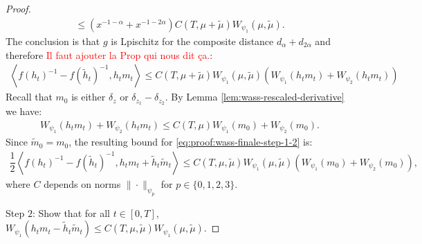 \documentclass[11pt,a4paper]{article}
\newcommand{\red}[1]{\textcolor{red}{#1}}
\newcommand{\brac}[1]{\left\langle#1\right\rangle}
\begin{document}
\begin{proof}
\begin{multline*}
        \leq \left(x^{-1-\alpha} + x^{-1-2\alpha}\right)C(T,\mu + \tilde{\mu}) W_{\psi_1}(\mu,\tilde{\mu}).
    \end{multline*}
    The conclusion is that $g$ is Lpischitz for the composite distance $d_{\alpha} + d_{2\alpha}$ and therefore \red{Il faut ajouter la Prop qui nous dit ça.}:
    \begin{align*}
        \brac{f(h_t)^{-1} - f(\tilde{h}_t)^{-1},h_t m_t } \leq C(T,\mu + \tilde{\mu})W_{\psi_1}(\mu,\tilde{\mu})\left( W_{\psi_1}\left(h_t m_t\right) + W_{\psi_2}\left(h_t m_t\right)\right)
    \end{align*}
    Recall that $m_0$ is either $\delta_z$ or $\delta_{z_1}-\delta_{z_2}$. By Lemma \ref{lem:wass-rescaled-derivative} we have:
    \begin{align*}
        W_{\psi_1}\left(h_t m_t\right) + W_{\psi_2}\left(h_t m_t\right) \leq C(T,\mu) W_{\psi_1}\left(m_0\right) + W_{\psi_2}\left(m_0\right).
    \end{align*}
    Since $\tilde{m}_0 = m_0$, the resulting bound for \eqref{eq:proof:wass-finale-step-1-2} is:
    \begin{align*}
        \dfrac12\brac{f(h_t)^{-1} - f(\tilde{h}_t)^{-1},h_t m_t + \tilde{h}_t\tilde{m}_t}  \leq C(T,\mu,\tilde{\mu})W_{\psi_1}(\mu,\tilde{\mu})\left( W_{\psi_1}\left(m_0\right) + W_{\psi_2}\left(m_0\right)\right),
    \end{align*}
    where $C$ depends on norms $\|\cdot\|_{\psi_p}$ for $p \in \lbrace 0,1,2,3 \rbrace$.

    Step $2$: Show that for all $t \in [0,T]$, $ W_{\psi_1}(h_tm_t - \tilde{h}_t\tilde{m}_t) \leq C(T,\mu,\tilde{\mu}) W_{\psi_1}(\mu,\tilde{\mu})$.
    

\end{proof}
\end{document}
